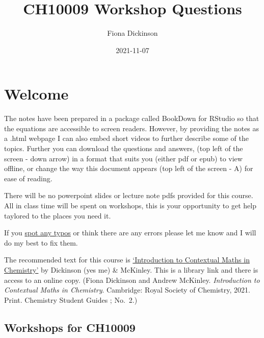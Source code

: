 \documentclass[
]{book}
\title{CH10009 Workshop Questions}
\author{Fiona Dickinson}
\date{2021-11-07}
\begin{document}
\maketitle

{
\setcounter{tocdepth}{1}
\tableofcontents
}
\hypertarget{welcome}{%
\chapter*{Welcome}\label{welcome}}

The notes have been prepared in a package called BookDown for RStudio so that the equations are accessible to screen readers. However, by providing the notes as a .html webpage I can also embed short videos to further describe some of the topics. Further you can download the questions and answers, (top left of the screen - down arrow) in a format that suits you (either pdf or epub) to view offline, or change the way this document appears (top left of the screen - A) for ease of reading.

There will be no powerpoint slides or lecture note pdfs provided for this course. All in class time will be spent on workshops, this is your opportunity to get help taylored to the places you need it.

If you \href{https://docs.google.com/forms/d/1hxCt8XcQ8taLXfymZfl2LUOjHACQ4INnRK6GeArTxsc/edit}{spot any typos} or think there are any errors please let me know and I will do my best to fix them.

The recommended text for this course is \href{https://bath-ac-primo.hosted.exlibrisgroup.com/primo-explore/fulldisplay?docid=44BAT_ALMA_DS51100784580002761\&context=L\&vid=44BAT_VU1\&lang=en_US\&search_scope=CSCOP_44BAT_DEEP\&adaptor=Local\%20Search\%20Engine\&tab=local\&query=any,contains,contextual\%20maths\%20in\%20chemistry\&sortby=rank\&pcAvailability=false}{`Introduction to Contextual Maths in Chemistry'} by Dickinson (yes me) \& McKinley. This is a library link and there is access to an online copy. (Fiona Dickinson and Andrew McKinley. \emph{Introduction to Contextual Maths in Chemistry}. Cambridge: Royal Society of Chemistry, 2021. Print. Chemistry Student Guides ; No.~2.)

\hypertarget{workshops-for-ch10009}{%
\section*{Workshops for CH10009}\label{workshops-for-ch10009}}
\end{document}
